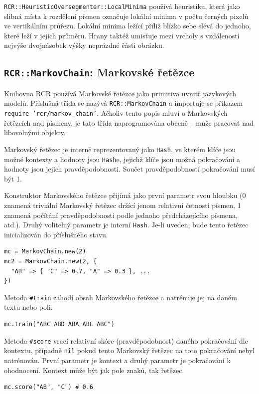 \documentclass[a4paper]{article}
\begin{document}
\texttt{RCR::HeuristicOversegmenter::LocalMinima} používá heuristiku, která
jako slibná místa k rozdělení písmen označuje lokální minima v počtu
černých pixelů ve vertikálním průřezu. Lokální minima ležící příliž blízko
sebe slévá do jednoho, které leží v jejich průměru. Hrany taktéž umisťuje
mezi vrcholy s vzdáleností nejvýše dvojnásobek výšky neprázdné části obrázku.

\subsection{\texttt{RCR::MarkovChain}: Markovské řetězce}
Knihovna RCR používá Markovské řetězce jako primitiva uvnitř jazykových modelů.
Příslušná třída se nazývá \texttt{RCR::MarkovChain} a importuje se příkazem
\texttt{require 'rcr/markov\_chain'}. Ačkoliv tento popis mluví o Markovských
řetězcích nad písmeny, je tato třída naprogramována obecně -- může pracovat nad
libovolnými objekty.

Markovský řetězec je interně reprezentovaný jako \texttt{Hash}, ve kterém klíče
jsou možné kontexty a hodnoty jsou \texttt{Hash}e, jejichž klíče jsou možná
pokračování a hodnoty jsou jejich pravděpodobnosti. Součet pravděpodobností
pokračování musí být 1.

Konstruktor Markovského řetězce přijímá jako první parametr svou hloubku (0
znamená triviální Markovský řetězec držící jenom relativní četnosti písmen, 1
znamená počítání pravděpodobnosti podle jednoho předcházejícího písmena, atd.).
Druhý volitelný parametr je interní \texttt{Hash}. Je-li uveden, bude tento
řetězec inicializován do příslušného stavu.
\begin{lstlisting}
mc = MarkovChain.new(2)
mc2 = MarkovChain.new(2, {
  "AB" => { "C" => 0.7, "A" => 0.3 }, ...
})
\end{lstlisting}

Metoda \texttt{\#train} zahodí obsah Markovského řetězce a natrénuje jej na
daném textu nebo poli.
\begin{lstlisting}
mc.train("ABC ABD ABA ABC ABC")
\end{lstlisting}

Metoda \texttt{\#score} vrací relativní skóre (pravděpodobnost) daného
pokračování dle kontextu, případně \texttt{nil} pokud tento Markovský řetězec
na toto pokračování nebyl natrénován. První parametr je kontext a druhý parametr
je pokračování k ohodnocení. Kontext může být jak pole znaků, tak řetězec.
\begin{lstlisting}
mc.score("AB", "C") # 0.6
\end{lstlisting}
\end{document}
